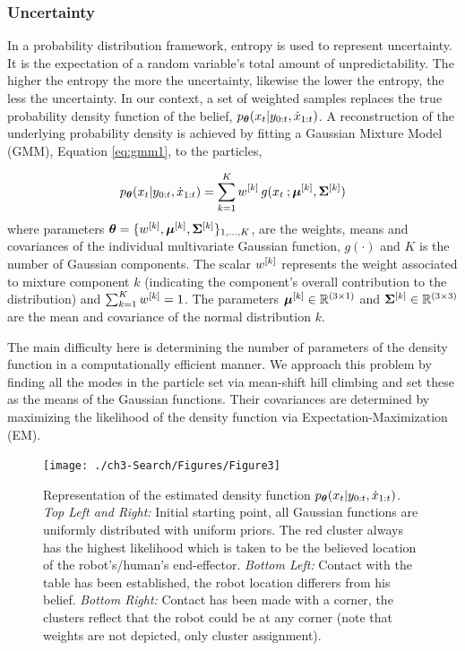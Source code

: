 \subsubsection{Uncertainty}


In a probability distribution framework, entropy is used to represent uncertainty. It is the expectation of a 
random variable's total amount of unpredictability. The higher the entropy the more the uncertainty, likewise the 
lower the entropy, the less the uncertainty. In our context, a set of weighted samples replaces 
the true probability density function of the belief, $p_{\boldsymbol{\theta}}(x_t|y_{0:t},\dot{x}_{1:t})$. A reconstruction of 
the underlying probability density is achieved by fitting a Gaussian  Mixture Model (GMM), Equation \ref{eq:gmm1}, to the particles,

\begin{equation}\label{eq:gmm1}
  p_{\boldsymbol{\theta}}(x_t|y_{0:t},\dot{x}_{1:t}) = \sum\limits_{k=1}^{K} w^{[k]}\, g(x_t\: ;\boldsymbol{\mu}^{[k]},\boldsymbol{\Sigma}^{[k]} )
\end{equation}
where parameters $\boldsymbol{\theta} = \{w^{[k]},\boldsymbol{\mu}^{[k]},\boldsymbol{\Sigma}^{[k]}\}_{1,\dots,K}$, are the weights, means and covariances of the individual multivariate Gaussian function, $g(\cdot)$ and
$K$ is the number of Gaussian components. The scalar $w^{[k]}$ represents the weight associated to mixture component $k$ 
(indicating the component's overall contribution to the distribution) and $\sum_{k=1}^{K} w^{[k]} = 1$. The parameters $\boldsymbol{\mu}^{[k]} \in \mathbb{R}^{(3\times 1)}$ 
and $\boldsymbol{\Sigma}^{[k]} \in \mathbb{R}^{(3\times 3)}$ are the mean and covariance of the normal distribution $k$. 

The main difficulty here is determining the number of parameters of the density function in a computationally efficient manner.
We approach this problem by finding all the modes in the particle set via mean-shift hill climbing and set these as the 
means of the Gaussian functions. Their covariances are determined by maximizing the likelihood of the density function 
via Expectation-Maximization (EM). 
%
%

\begin{figure}
 \centering
   \texttt{[image: ./ch3-Search/Figures/Figure3]}
  \caption{Representation of the estimated density function $p_{\boldsymbol{\theta}}(x_t|y_{0:t},\dot{x}_{1:t})$. \textit{Top Left and Right:} Initial starting point, 
  all Gaussian functions are uniformly distributed with uniform priors. The red cluster always has the highest likelihood which is taken
  to be the believed location of the robot's/human's end-effector. \textit{Bottom Left:} Contact with the table has been established, the robot location differers
  from his belief. \textit{Bottom Right:} Contact has been made with a corner, the clusters reflect that the robot could be at any corner (note that weights are not 
  depicted, only cluster assignment).}
  \label{fig:clustering}
\end{figure}


